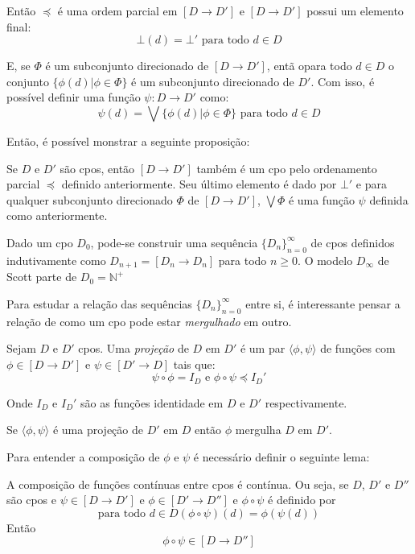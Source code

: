 \documentclass[../main.tex]{subfiles}
\begin{document}
Então $\preceq$ é uma ordem parcial em $[D \to D']$ e $[D \to D']$ possui um elemento final: $$\bot (d) = \bot' \text{ para todo } d \in D$$

E, se $\Phi$ é um subconjunto direcionado de $[D \to D']$, entã opara todo $d \in D$ o conjunto $\{\phi(d) | \phi \in \Phi\}$ é um subconjunto direcionado de $D'$. Com isso, é possível definir uma função $\psi : D \to D'$ como: $$\psi (d) = \bigvee \{\phi (d) | \phi \in \Phi\} \text{ para todo } d \in D$$

Então, é possível monstrar a seguinte proposição:

\begin{proposition}
    Se $D$ e $D'$ são cpos, então $[D \to D']$ também é um cpo pelo ordenamento parcial $\preceq$ definido anteriormente. Seu último elemento é dado por $\bot'$ e para qualquer subconjunto direcionado $\Phi$ de $[D \to D']$, $\bigvee \Phi$ é uma função $\psi$ definida como anteriormente.
\end{proposition}

Dado um cpo $D_0$, pode-se construir uma sequência $\{D_n\}^{\infty}_{n=0}$ de cpos definidos indutivamente como $D_{n + 1} = [D_n \to D_n]$ para todo $n \geq 0$. O modelo $D_{\infty}$ de Scott parte de $D_0 = \mathbb{N}^+$

Para estudar a relação das sequências $\{D_n\}^{\infty}_{n=0}$ entre si, é interessante pensar a relação de como um cpo pode estar \emph{mergulhado} em outro.

\begin{definition}
    Sejam $D$ e $D'$ cpos. Uma \emph{projeção} de $D$ em $D'$ é um par $\langle \phi, \psi \rangle$ de funções com $\phi \in [D \to D']$ e $\psi \in [D' \to D]$ tais que: $$\psi \circ \phi = I_D \text{ e } \phi \circ \psi \preceq I_D'$$

    Onde $I_D$ e $I_D'$ são as funções identidade em $D$ e $D'$ respectivamente.
\end{definition}

Se $\langle \phi, \psi \rangle$ é uma projeção de $D'$ em $D$ então $\phi$ mergulha $D$ em $D'$.

Para entender a composição de $\phi$ e $\psi$ é necessário definir o seguinte lema:

\begin{lemma}
    A composição de funções contínuas entre cpos é contínua. Ou seja, se $D$, $D'$ e $D''$ são cpos e $\psi \in [D \to D']$ e $\phi \in [D' \to D'']$ e $\phi \circ \psi$ é definido por $$\text{para todo } d \in D (\phi \circ \psi)(d) = \phi (\psi (d))$$
    Então $$\phi \circ \psi \in [D \to D'']$$
\end{lemma}
\end{document}
